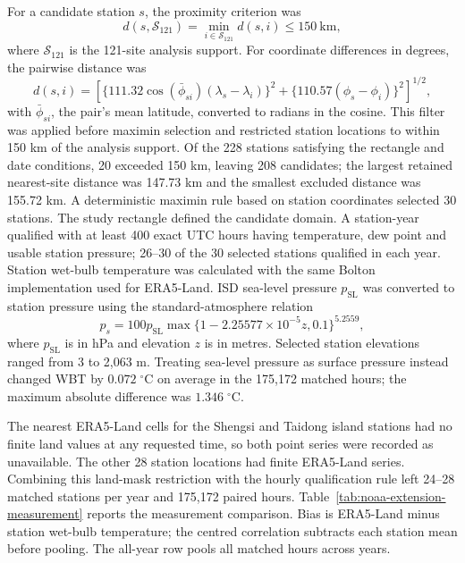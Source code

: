 \documentclass[namedate,webpdf,modern,mediumone]{oup-authoring-template}
\theoremstyle{thmstyleone}
\begin{document}
For a candidate station $s$, the proximity criterion was
\[
 d(s,\mathcal S_{121})=\min_{i\in\mathcal S_{121}}d(s,i)\leq150\ \mathrm{km},
\]
where $\mathcal S_{121}$ is the 121-site analysis support. For coordinate
differences in degrees, the pairwise distance was
\[
d(s,i)=\left[
 \{111.32\cos(\bar\phi_{si})(\lambda_s-\lambda_i)\}^{2}
 +\{110.57(\phi_s-\phi_i)\}^{2}
\right]^{1/2},
\]
with $\bar\phi_{si}$, the pair's mean latitude, converted to radians in the
cosine. This filter was
applied before maximin selection and restricted station locations to within
150 km of the analysis support. Of the 228 stations satisfying the rectangle and date
conditions, 20 exceeded 150 km, leaving 208 candidates; the largest retained
nearest-site distance was 147.73 km and the smallest excluded distance was
155.72 km. A
deterministic maximin rule based on station coordinates selected 30 stations.
The study rectangle defined the candidate domain. A station-year qualified with at least 400 exact UTC
hours having temperature, dew point and usable station pressure; 26--30 of the
30 selected stations qualified in each year. Station wet-bulb temperature was
calculated with the same Bolton implementation used for ERA5-Land. ISD
sea-level pressure $p_{\mathrm{SL}}$ was converted to station pressure using
the standard-atmosphere relation
\[
 p_s=100p_{\mathrm{SL}}
 \max\{1-2.25577\times10^{-5}z,0.1\}^{5.2559},
\]
where $p_{\mathrm{SL}}$ is in hPa and elevation $z$ is in metres. Selected
station elevations ranged from 3 to 2,063 m. Treating sea-level pressure as
surface pressure instead changed WBT by $0.072\;{}^\circ$C on average in the
175,172 matched hours; the maximum absolute difference was
$1.346\;{}^\circ$C.

The nearest ERA5-Land cells for the Shengsi and Taidong island stations had no
finite land values at any requested time, so both point series were recorded
as unavailable. The other
28 station locations had finite ERA5-Land series. Combining this land-mask
restriction with the hourly qualification rule left 24--28 matched stations
per year and 175,172 paired hours. Table~\ref{tab:noaa-extension-measurement}
reports the measurement comparison. Bias is ERA5-Land minus station wet-bulb
temperature; the centred correlation subtracts each station mean before
pooling. The all-year row pools all matched hours across years.
\end{document}
